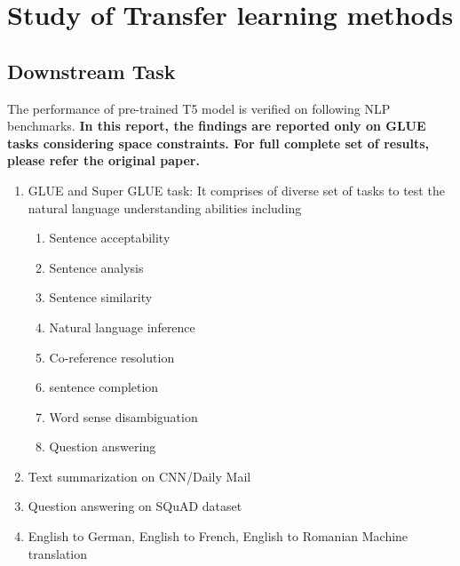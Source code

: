\section{Study of Transfer learning methods}
\subsection{Downstream Task}
The performance of pre-trained T5 model is verified on following NLP benchmarks. \textbf{In this report, the findings are reported only on GLUE tasks considering space constraints. For full complete set of results, please refer the original paper. }
\begin{enumerate}
    \item GLUE and Super GLUE task: It comprises of diverse set of tasks to test the natural language understanding abilities including 
    \begin{enumerate}
        \item Sentence acceptability 
        \item Sentence analysis
        \item Sentence similarity
        \item Natural language inference
        \item Co-reference resolution
        \item sentence completion
        \item Word sense disambiguation
        \item Question answering
    \end{enumerate}
    \item Text summarization on CNN/Daily Mail
    \item Question answering on SQuAD dataset
    \item English to German, English to French, English to Romanian Machine translation 
\end{enumerate}

